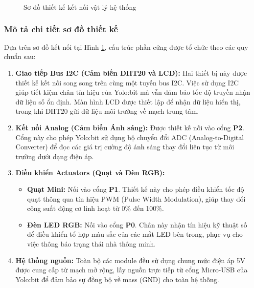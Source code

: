 \begin{figure}[H]
    \vspace{10pt}
    \caption{Sơ đồ thiết kế kết nối vật lý hệ thống}
    \label{fig:physical_connection_diagram}
\end{figure}

\subsubsection{Mô tả chi tiết sơ đồ thiết kế}

Dựa trên sơ đồ kết nối tại Hình \ref{fig:physical_connection_diagram}, cấu trúc phần cứng được tổ chức theo các quy chuẩn sau:

\begin{enumerate}
    \item \textbf{Giao tiếp Bus I2C (Cảm biến DHT20 và LCD):} Hai thiết bị này được thiết kế kết nối song song trên cùng một tuyến bus I2C. Việc sử dụng I2C giúp tiết kiệm chân tín hiệu của Yolo:bit mà vẫn đảm bảo tốc độ truyền nhận dữ liệu số ổn định. Màn hình LCD được thiết lập để nhận dữ liệu hiển thị, trong khi DHT20 gửi dữ liệu môi trường về mạch trung tâm.
    
    \item \textbf{Kết nối Analog (Cảm biến Ánh sáng):} Được thiết kế nối vào cổng \textbf{P2}. Cổng này cho phép Yolo:bit sử dụng bộ chuyển đổi ADC (Analog-to-Digital Converter) để đọc các giá trị cường độ ánh sáng thay đổi liên tục từ môi trường dưới dạng điện áp.
    
    \item \textbf{Điều khiển Actuators (Quạt và Đèn RGB):}
    \begin{itemize}
        \item \textbf{Quạt Mini:} Nối vào cổng \textbf{P1}. Thiết kế này cho phép điều khiển tốc độ quạt thông qua tín hiệu PWM (Pulse Width Modulation), giúp thay đổi công suất động cơ linh hoạt từ 0\% đến 100\%.
        \item \textbf{Đèn LED RGB:} Nối vào cổng \textbf{P0}. Chân này nhận tín hiệu kỹ thuật số để điều khiển tổ hợp màu sắc của các mắt LED bên trong, phục vụ cho việc thông báo trạng thái nhà thông minh.
    \end{itemize}
    
    \item \textbf{Hệ thống nguồn:} Toàn bộ các module đều sử dụng chung mức điện áp 5V được cung cấp từ mạch mở rộng, lấy nguồn trực tiếp từ cổng Micro-USB của Yolo:bit để đảm bảo sự đồng bộ về mass (GND) cho toàn hệ thống.
\end{enumerate}